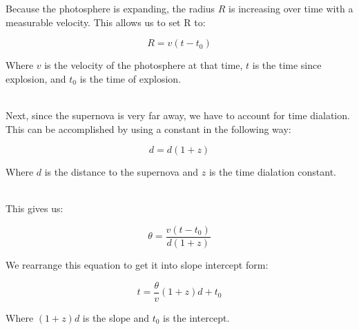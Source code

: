 Because the photosphere is expanding, the radius $R$ is increasing over time with a measurable velocity. This allows us to set R to:

\begin{equation}\label{eqn:radius}
    R = v(t-t_0)
\end{equation}

Where $v$ is the velocity of the photosphere at that time, $t$ is the time since explosion, and $t_0$ is the time of explosion.

\\

Next, since the supernova is very far away, we have to account for time dialation. This can be accomplished by using a constant in the following way:

\begin{equation}\label{eqn:distance}
    d = d(1+z)
\end{equation}

Where $d$ is the distance to the supernova and $z$ is the time dialation constant.

\\

This gives us:

\begin{equation}\label{eqn:pre_linear}
    \theta = \frac{v(t-t_0)}{d(1+z)}
\end{equation}

We rearrange this equation to get it into slope intercept form:

\begin{equation}\label{eqn:slope_incercept}
    t = \frac{\theta}{v}(1+z)d + t_0
\end{equation}

Where $(1+z)d$ is the slope and $t_0$ is the intercept.




